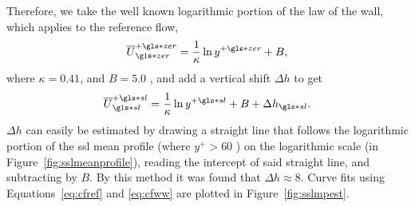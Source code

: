 Therefore, we take the well known logarithmic portion of the law of the wall, which applies to the reference flow,
\begin{equation} 
	\overline{U}\pz\zz=\frac{1}{\kappa}\ln y\pz+B\label{eq:cfref}
,\end{equation}
where $\kappa=0.41$, and  $B=5.0$ \cite{schlichting2016}, and add a vertical shift  $\Delta h$ to get
 \begin{equation}
	 \overline{U}\ps\ssl=\frac{1}{\kappa}\ln y\ps +B+\Delta h\ssl\label{eq:cfww}
.\end{equation}
$\Delta h$ can easily be estimated by drawing a straight line that follows the logarithmic portion of the \gls*{ssl} mean profile (where $y^{+}>60$ ) on the logarithmic scale (in Figure~\ref{fig:sslmeanprofile}), reading the intercept of said straight line, and subtracting by $B$. By this method it was found that  $\Delta h\approx8$. Curve fits using Equations~\eqref{eq:cfref} and \eqref{eq:cfww} are plotted in Figure~\ref{fig:sslmpest}.

